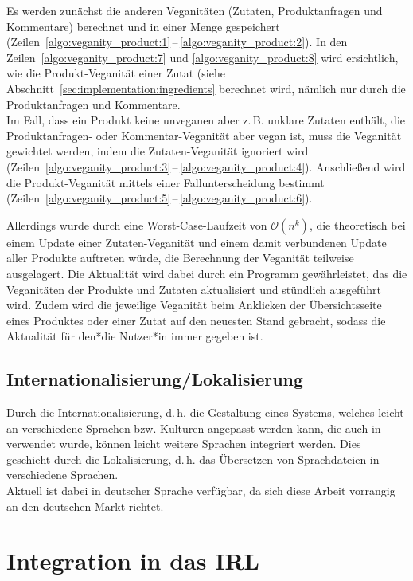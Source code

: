 Es werden zunächst die anderen Veganitäten (Zutaten, Produktanfragen und 
Kommentare) berechnet und in einer Menge gespeichert 
(Zeilen~\ref{algo:veganity_product:1}\,--\,\ref{algo:veganity_product:2}). In 
den Zeilen~\ref{algo:veganity_product:7} und \ref{algo:veganity_product:8} wird 
ersichtlich, wie die Produkt-Veganität einer Zutat (siehe 
Abschnitt~\ref{sec:implementation:ingredients} berechnet wird, nämlich nur 
durch die Produktanfragen und Kommentare.\\
Im Fall, dass ein Produkt keine unveganen aber z.\,B. unklare Zutaten enthält, 
die Produkt\-anfragen- oder Kommentar-Veganität aber vegan ist, muss die 
Veganität gewichtet werden, indem die Zutaten-Veganität ignoriert wird 
(Zeilen~\ref{algo:veganity_product:3}\,--\,\ref{algo:veganity_product:4}).
Anschließend wird die Produkt-Veganität mittels einer Fallunterscheidung 
bestimmt 
(Zeilen~\ref{algo:veganity_product:5}\,--\,\ref{algo:veganity_product:6}).

Allerdings wurde durch eine Worst-Case-Laufzeit von $\mathcal{O}
(n^k)$, die theoretisch bei einem Update einer Zutaten-Veganität und einem
damit verbundenen Update aller Produkte auftreten würde,
die Berechnung der Veganität teilweise ausgelagert.
Die Aktualität wird dabei durch ein Programm gewährleistet, das
die Veganitäten der Produkte und Zutaten aktualisiert und stündlich ausgeführt 
wird.
Zudem wird die
jeweilige Veganität beim Anklicken der Übersichtsseite eines Produktes
oder einer Zutat auf den neuesten Stand gebracht, sodass die
Aktualität für den*die Nutzer*in immer gegeben ist.

\subsection{Internationalisierung/Lokalisierung}
\label{sec:implementation:i18n}
\label{sec:implementation:l10n}

Durch die Internationalisierung, d.\,h.
die Gestaltung eines Systems, welches leicht an verschiedene Sprachen bzw. 
Kulturen angepasst werden kann, die auch in \name verwendet wurde, können 
leicht weitere Sprachen integriert werden. Dies geschieht durch die 
Lokalisierung,
d.\,h. das Übersetzen von 
Sprachdateien in verschiedene Sprachen.\\
Aktuell ist \name dabei in deutscher Sprache verfügbar, da 
sich diese Arbeit vorrangig an den deutschen Markt richtet.

\clearpage
\section{Integration in das \acl{IRL}}
\label{sec:implementation:irl}

